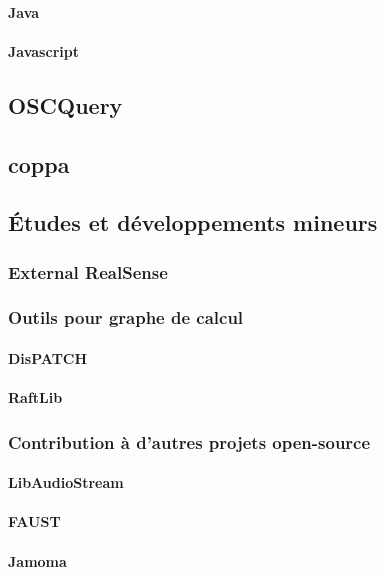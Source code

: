 \documentclass[french,a4paper]{book}
\begin{document}
\paragraph{Java}
\paragraph{Javascript}
\subsection{OSCQuery}
\subsection{coppa}

\subsection{Études et développements mineurs}
\subsubsection{External RealSense}
\subsubsection{Outils pour graphe de calcul}
\paragraph{DisPATCH}
\paragraph{RaftLib}

\subsubsection{Contribution à d'autres projets open-source}
\paragraph{LibAudioStream}
\paragraph{FAUST}
\paragraph{Jamoma}
\end{document}
